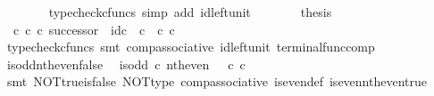 \begin{isabellebody}
\ \ \ \ \ \ \isamarkupfalse%
\ {\isacharparenleft}{\kern0pt}typecheck{\isacharunderscore}{\kern0pt}cfuncs{\isacharcomma}{\kern0pt}\ simp\ add{\isacharcolon}{\kern0pt}\ id{\isacharunderscore}{\kern0pt}left{\isacharunderscore}{\kern0pt}unit{}{\isacharparenright}{\kern0pt}\isanewline
\ \ \ \ \isamarkupfalse%
\ \isamarkupfalse%
\ {\isacharquery}{\kern0pt}thesis\isacommand{{\isachardot}{\kern0pt}}\isamarkupfalse%
\isanewline
\ \ \isamarkupfalse%
\isanewline
\ \ \isamarkupfalse%
\ {\isachardoublequoteopen}{\isacharparenleft}{\kern0pt}{\isasymt}\ {\isasymcirc}\isactrlsub c\ {\isasymbeta}\isactrlbsub {\isasymnat}\isactrlsub c\isactrlesub {\isacharparenright}{\kern0pt}\ {\isasymcirc}\isactrlsub c\ successor\ {\isacharequal}{\kern0pt}\ id\isactrlsub c\ {\isasymOmega}\ {\isasymcirc}\isactrlsub c\ {\isasymt}\ {\isasymcirc}\isactrlsub c\ {\isasymbeta}\isactrlbsub {\isasymnat}\isactrlsub c\isactrlesub {\isachardoublequoteclose}\isanewline
\ \ \ \ \isamarkupfalse%
\ {\isacharparenleft}{\kern0pt}typecheck{\isacharunderscore}{\kern0pt}cfuncs{\isacharcomma}{\kern0pt}\ smt\ comp{\isacharunderscore}{\kern0pt}associative{}\ id{\isacharunderscore}{\kern0pt}left{\isacharunderscore}{\kern0pt}unit{}\ terminal{\isacharunderscore}{\kern0pt}func{\isacharunderscore}{\kern0pt}comp{\isacharparenright}{\kern0pt}\isanewline
{}\isamarkupfalse%
%
\endisatagproof
{\isafoldproof}%
%
\isadelimproof
\isanewline
%
\endisadelimproof
\isanewline
{}\isamarkupfalse%
\ is{\isacharunderscore}{\kern0pt}odd{\isacharunderscore}{\kern0pt}nth{\isacharunderscore}{\kern0pt}even{\isacharunderscore}{\kern0pt}false{\isacharcolon}{\kern0pt}\isanewline
\ \ {\isachardoublequoteopen}is{\isacharunderscore}{\kern0pt}odd\ {\isasymcirc}\isactrlsub c\ nth{\isacharunderscore}{\kern0pt}even\ {\isacharequal}{\kern0pt}\ {\isasymf}\ {\isasymcirc}\isactrlsub c\ {\isasymbeta}\isactrlbsub {\isasymnat}\isactrlsub c\isactrlesub {\isachardoublequoteclose}\isanewline
%
\isadelimproof
\ \ %
\endisadelimproof
%
\isatagproof
{}\isamarkupfalse%
\ {\isacharparenleft}{\kern0pt}smt\ NOT{\isacharunderscore}{\kern0pt}true{\isacharunderscore}{\kern0pt}is{\isacharunderscore}{\kern0pt}false\ NOT{\isacharunderscore}{\kern0pt}type\ comp{\isacharunderscore}{\kern0pt}associative{}\ is{\isacharunderscore}{\kern0pt}even{\isacharunderscore}{\kern0pt}def{}\ is{\isacharunderscore}{\kern0pt}even{\isacharunderscore}{\kern0pt}nth{\isacharunderscore}{\kern0pt}even{\isacharunderscore}{\kern0pt}true\isanewline

\end{isabellebody}
